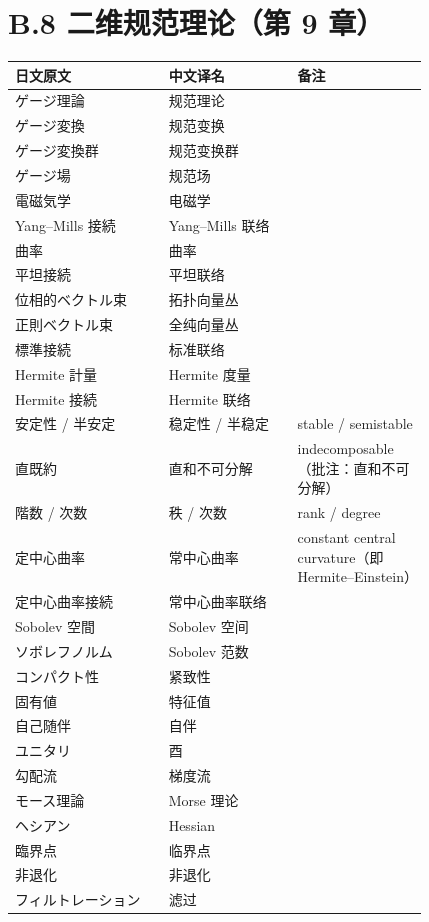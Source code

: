 \section*{B.8 二维规范理论（第 9 章）}
{\small
\begin{longtable}{p{0.31\linewidth} p{0.26\linewidth} p{0.25\linewidth}}
\toprule
日文原文 & 中文译名 & 备注 \\
\midrule
\endhead
ゲージ理論 & 规范理论 &  \\
ゲージ変換 & 规范变换 &  \\
ゲージ変換群 & 规范变换群 &  \\
ゲージ場 & 规范场 &  \\
電磁気学 & 电磁学 &  \\
Yang–Mills 接続 & Yang–Mills 联络 &  \\
曲率 & 曲率 &  \\
平坦接続 & 平坦联络 &  \\
位相的ベクトル束 & 拓扑向量丛 &  \\
正則ベクトル束 & 全纯向量丛 &  \\
標準接続 & 标准联络 &  \\
Hermite 計量 & Hermite 度量 &  \\
Hermite 接続 & Hermite 联络 &  \\
安定性 / 半安定 & 稳定性 / 半稳定 & stable / semistable \\
直既約 & 直和不可分解 & indecomposable（批注：直和不可分解） \\
階数 / 次数 & 秩 / 次数 & rank / degree \\
定中心曲率 & 常中心曲率 & constant central curvature（即 Hermite–Einstein） \\
定中心曲率接続 & 常中心曲率联络 &  \\
Sobolev 空間 & Sobolev 空间 &  \\
ソボレフノルム & Sobolev 范数 &  \\
コンパクト性 & 紧致性 &  \\
固有値 & 特征值 &  \\
自己随伴 & 自伴 &  \\
ユニタリ & 酉 &  \\
勾配流 & 梯度流 &  \\
モース理論 & Morse 理论 &  \\
ヘシアン & Hessian &  \\
臨界点 & 临界点 &  \\
非退化 & 非退化 &  \\
フィルトレーション & 滤过 &  \\

\end{longtable}}
